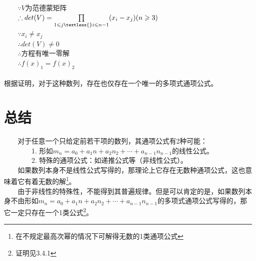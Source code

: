\documentclass[12pt]{article}
\begin{document}
          　　$\because V$为范德蒙矩阵\\
          　　$\therefore det(V)=\prod\limits_{1\leqslant{}j\textless{}i\leqslant{}n-1}(x_{i}-x_{j}) (n\geqslant{}3)$\\
          　　$\because x_{i}\neq{}x_{j}$\\
          　　$\therefore det(V)\neq0$\\
          　　$\therefore$方程有唯一零解\\
          　　$\therefore f(x)_{1}=f(x)_{2}$\\
        \\
        根据证明，对于这种数列，存在也仅存在一个唯一的多项式通项公式。
      \section{总结}
        　　对于任意一个只给定前若干项的数列，其通项公式有2种可能：\\
        　　　　1. 形如$m_{n}=a_{0}+a_{1}n+a_{2}n_{2}+\cdots+a_{n-1}n_{n-1}$的线性公式。\\
        　　　　2. 特殊的通项公式：如递推公式等（非线性公式）。\\
        　　如果数列本身不是线性公式写得的，那理论上它存在无数种通项公式，这也意味着它有着无数的解\footnote{在不规定最高次幂的情况下可解得无数的1类通项公式}。\\
        　　由于非线性的特殊性，不能得到其普遍规律。但是可以肯定的是，如果数列本身不由形如$m_{n}=a_{0}+a_{1}n+a_{2}n_{2}+\cdots+a_{n-1}n_{n-1}$的多项式通项公式写得的，那它一定只存在一个1类公式\footnote{证明见3.4.1}。
\end{document}
